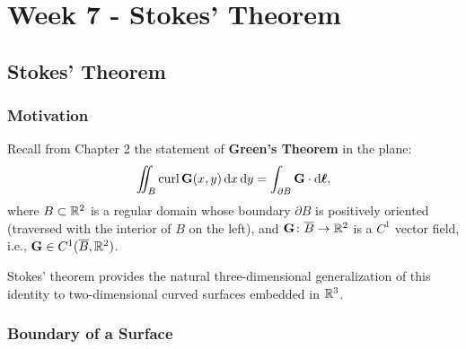 \chapter{Week 7 - Stokes' Theorem}

\section{Stokes' Theorem}

\subsection{Motivation}
Recall from Chapter 2 the statement of \textbf{Green's Theorem} in the plane:
\begin{equation}
    \iint_{B} \operatorname{curl} \mathbf{G}(x,y) \,\mathrm{d}x\,\mathrm{d}y = \int_{\partial B} \mathbf{G} \cdot \mathrm{d}\bm{\ell},
\end{equation}
where $B \subset \mathbb{R}^2$ is a regular domain whose boundary $\partial B$ is positively oriented (traversed with the interior of $B$ on the left), and $\mathbf{G} \colon \overline{B} \to \mathbb{R}^2$ is a $C^1$ vector field, i.e., $\mathbf{G} \in C^1(\overline{B}, \mathbb{R}^2)$.

Stokes' theorem provides the natural three-dimensional generalization of this identity to two-dimensional curved surfaces embedded in $\mathbb{R}^3$.

\subsection{Boundary of a Surface}

